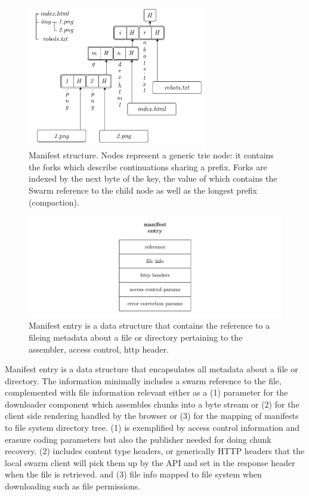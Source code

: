 \begin{figure}[htbp]
\centering
\includegraphics[width=0.7\textwidth]{fig/manifest-structure.pdf}
\caption[Manifest structure \statusgreen]{Manifest structure. Nodes represent a generic trie node: it contains the forks which describe continuations sharing a prefix. Forks are indexed by the next byte of the key, the value of which contains the Swarm reference to the child node as well as the longest prefix (compaction).}
\label{fig:manifest-structure}
\end{figure}

\begin{figure}[htbp]
\centering
\includegraphics[width=\textwidth]{fig/manifest-entry.pdf}
\caption[Manifest entry \statusgreen]{Manifest entry is a data  structure that contains the reference to a fileing metadata about a file or directory  pertaining to the assembler, access control, http header.}
\label{fig:manifest-entry}
\end{figure}

Manifest entry is a data  structure that encapsulates all metadata about a file or directory.
The information minimally includes a swarm reference to the file, complemented with file information
relevant either as a (1) parameter for the downloader component which assembles chunks into a byte stream or (2) for the client side rendering handled by the browser or (3) for the mapping of manifests to file system directory tree. (1) is exemplified by access control information and erasure coding parameters but also the publisher needed for doing chunk recovery. (2) includes content type headers, or generically HTTP headers that the local swarm client will pick them up by the API and set in the response header when the file is retrieved. 
and (3) file info mapped to file system when downloading such as file permissions.

